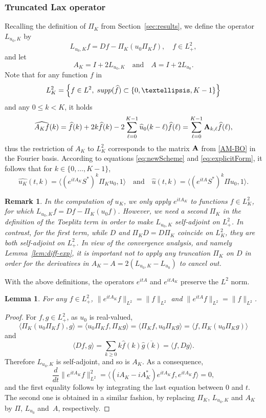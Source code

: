 \documentclass [11pt] {article}
\newtheorem{lem}[thm]{Lemma}
\newtheorem{rem}[thm]{Remark}
\begin{document}
\subsubsection{Truncated Lax operator} 
\label{sec:truncated-ops}
Recalling the definition of $\Pi_K$ from Section~\ref{sec:results}, we define the operator  $L_{u_0,K}$ by
\[
L_{u_0,K}f=Df-\Pi_K(u_0\Pi_Kf), \quad f \in L^{2}_{+},
\]
and let
\[
A_K=I+2L_{u_0,K}\quad \text{and}\quad A=I+2L_{u_0}.
\]
Note that for any function $f$ in
\[
L^2_K=\Big\{f\in L^2,\;{\rm supp}(\widehat f)\subset \{0,\dots,K-1\}\Big\}
\]
and any $0\leq k<K$, it holds
\[
\widehat{A_Kf}(k)=\widehat f(k)+2k\widehat f(k)-2\sum_{\ell=0}^{K-1}\widehat u_0(k-\ell)\widehat f(\ell) = \sum_{\ell=0}^{K-1}{\bf A}_{k,\ell}\widehat f(\ell),
\]
thus the restriction of $A_K$ to $L^2_K$ corresponds to the matrix ${\bf A}$ from \eqref{AM-BO} in the Fourier basis.
According to equations \eqref{eq:newScheme} and \eqref{eq:explicitForm}, it follows that for $k\in\{0,\dots,K-1\}$,
\[
\widehat{u_K}(t,k)=\langle(e^{itA_K}S^*)^k\Pi_K u_0,1\rangle
\quad \text{and}\quad
\widehat u(t,k)=\langle(e^{itA}S^*)^k\Pi u_0,1\rangle.
\]
\begin{rem}
In the computation of $u_K$, we only apply $e^{itA_K}$ to functions $f\in L^2_K$,
for which $L_{u_0,K}f=Df-\Pi_K(u_0f)$. However, we need a second $\Pi_K$ in the definition of the Toeplitz term in order to make $L_{u_0,K}$ self-adjoint on $L^2_+$.
In contrast, for the first term, while $D$ and $\Pi_KD=D\Pi_K$ coincide on $L^2_{K}$, they are both self-adjoint on $L^2_{+}$. In view of the convergence analysis, and namely Lemma~\ref{lem:diff-exp}, it is important not to apply any truncation $\Pi_K$ on $D$ in order for the derivatives in $A_K-A = 2(L_{u_0,K}-L_{u_0})$ to cancel out.
\end{rem}

With the above definitions, the operators $e^{itA}$ and  $e^{itA_K}$ preserve the $L^2$ norm.
\begin{lem}
\label{lem:self-adjoint}
For any $f\in L^2_+$, $\|e^{itA_K}f\|_{L^2}=\|f\|_{L^2}$ and $\|e^{itA}f\|_{L^2}=\|f\|_{L^2}$.
\end{lem}
\begin{proof}
For $f,g\in L^2_+$, as $u_0$ is real-valued,
\[
\langle\Pi_K(u_0\Pi_Kf),g\rangle=\langle u_0\Pi_Kf,\Pi_Kg\rangle=\langle\Pi_Kf,u_0\Pi_Kg\rangle=\langle f,\Pi_K(u_0\Pi_Kg)\rangle
\]
and
\[
\langle Df,g\rangle= \sum_{k\geq 0} k\widehat f(k)\overline{\widehat g(k)}=\langle f,Dg\rangle.
\]
Therefore $L_{u_0,K}$ is self-adjoint, and so is $A_K$. As a consequence,
\[
\frac{d}{dt}\|e^{itA_K}f\|_{L^2}^2=\langle(iA_K-iA_K^*)e^{itA_K}f,e^{itA_K}f\rangle=0,
\]
and the first equality follows by integrating the last equation between $0$ and $t$. The second one is obtained in a similar fashion, by replacing $\Pi_K$, $L_{u_0,K}$ and $A_K$ by $\Pi$, $L_{u_0}$ and~$A$, respectively.
\end{proof}
\end{document}
